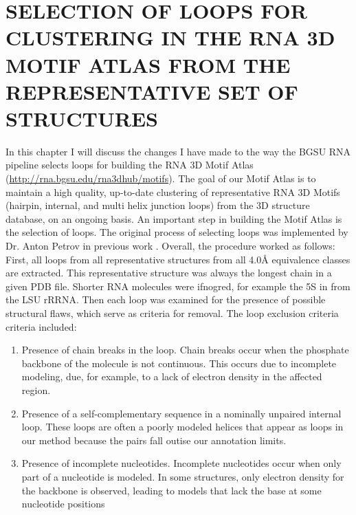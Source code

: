 \chapter{SELECTION OF LOOPS FOR CLUSTERING IN THE RNA 3D MOTIF ATLAS FROM THE
REPRESENTATIVE SET OF STRUCTURES}

In this chapter I will discuss the changes I have made to the way the BGSU RNA
pipeline selects loops for building the RNA 3D Motif Atlas
(\href{http://rna.bgsu.edu/rna3dhub/motifs}{http://rna.bgsu.edu/rna3dhub/motifs}).
The goal of our Motif Atlas is to maintain a high quality, up-to-date clustering
of representative RNA 3D Motifs (hairpin, internal, and multi helix junction
loops) from the 3D structure database, on an ongoing basis. An important step in
building the Motif Atlas is the selection of loops. The original process of
selecting loops was implemented by Dr. Anton Petrov in previous work
\cite{Petrov2012}. Overall, the procedure worked as follows: First, all loops
from all representative structures from all 4.0{\AA} equivalence classes are
extracted. This representative structure was always the longest chain in a given PDB
file. Shorter RNA molecules were ifnogred, for example the 5S in from the LSU
rRRNA. Then each loop was examined for the presence of possible structural flaws,
which serve as criteria for removal. The loop exclusion criteria criteria
included:

\begin{enumerate}
  \item Presence of chain breaks in the loop. Chain breaks occur when the
    phosphate backbone of the molecule is not continuous. This occurs due to
    incomplete modeling, due, for example, to a lack of electron density in the
    affected region.

  \item Presence of a self-complementary sequence in a nominally unpaired
    internal loop. These loops are often a poorly modeled helices that appear as
    loops in our method because the pairs fall outise our annotation limits.

  \item Presence of incomplete nucleotides. Incomplete nucleotides occur when
    only part of a nucleotide is modeled. In some structures, only electron
    density for the backbone is observed, leading to models that lack the base
    at some nucleotide positions
\end{enumerate}


